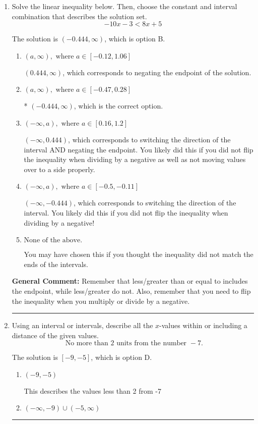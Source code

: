 \documentclass{extbook}[14pt]
\newcommand{\litem}[1]{\item #1

\rule{\textwidth}{0.4pt}}
\begin{document}
\begin{enumerate}\litem{
Solve the linear inequality below. Then, choose the constant and interval combination that describes the solution set.
\[ -10x -3 < 8x + 5 \]

The solution is \( (-0.444, \infty) \), which is option B.\begin{enumerate}[label=\Alph*.]
\item \( (a, \infty), \text{ where } a \in [-0.12, 1.06] \)

 $(0.444, \infty)$, which corresponds to negating the endpoint of the solution.
\item \( (a, \infty), \text{ where } a \in [-0.47, 0.28] \)

* $(-0.444, \infty)$, which is the correct option.
\item \( (-\infty, a), \text{ where } a \in [0.16, 1.2] \)

 $(-\infty, 0.444)$, which corresponds to switching the direction of the interval AND negating the endpoint. You likely did this if you did not flip the inequality when dividing by a negative as well as not moving values over to a side properly.
\item \( (-\infty, a), \text{ where } a \in [-0.5, -0.11] \)

 $(-\infty, -0.444)$, which corresponds to switching the direction of the interval. You likely did this if you did not flip the inequality when dividing by a negative!
\item \( \text{None of the above}. \)

You may have chosen this if you thought the inequality did not match the ends of the intervals.
\end{enumerate}

\textbf{General Comment:} Remember that less/greater than or equal to includes the endpoint, while less/greater do not. Also, remember that you need to flip the inequality when you multiply or divide by a negative.
}
\litem{
Using an interval or intervals, describe all the $x$-values within or including a distance of the given values.
\[ \text{ No more than } 2 \text{ units from the number } -7. \]

The solution is \( [-9, -5] \), which is option D.\begin{enumerate}[label=\Alph*.]
\item \( (-9, -5) \)

This describes the values less than 2 from -7
\item \( (-\infty, -9) \cup (-5, \infty) \)


\end{enumerate}}
\end{enumerate}
\end{document}
